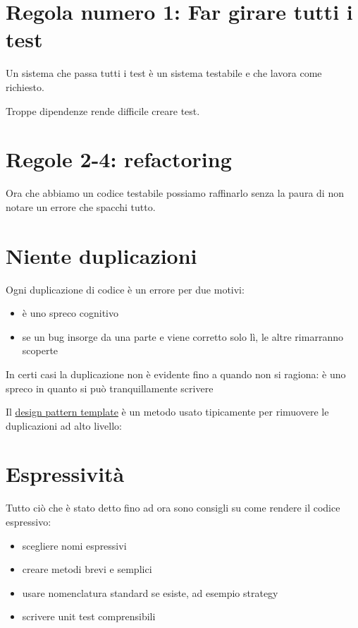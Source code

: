 \documentclass[11pt,a4paper]{book}
\begin{document}
\section{Regola numero 1: Far girare tutti i test}
Un sistema che passa tutti i test è un sistema testabile e che lavora come richiesto.

Troppe dipendenze rende difficile creare test.

\section{Regole 2-4: refactoring}
Ora che abbiamo un codice testabile possiamo raffinarlo senza la paura di non notare un errore che spacchi tutto.

\section{Niente duplicazioni}\label{par: duplicazione}
Ogni duplicazione di codice è un errore per due motivi:
\begin{itemize}
	\item è uno spreco cognitivo
	\item se un bug insorge da una parte e viene corretto solo lì, le altre rimarranno scoperte
\end{itemize}

In certi casi la duplicazione non è evidente fino a quando non si ragiona:
\label{code: 059}
è uno spreco in quanto si può tranquillamente scrivere
\label{code: 060}

Il \href{https://refactoring.guru/design-patterns/template-method}{design pattern template} è un metodo usato tipicamente per rimuovere le duplicazioni ad alto livello:
\label{code: 061}

\section{Espressività}
Tutto ciò che è stato detto fino ad ora sono consigli su come rendere il codice espressivo:
\begin{itemize}
	\item scegliere nomi espressivi
	\item creare metodi brevi e semplici
	\item usare nomenclatura standard se esiste, ad esempio strategy
	\item scrivere unit test comprensibili
\end{itemize}
\end{document}
